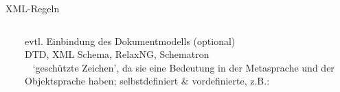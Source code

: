 


\begin{frame}{XML-Regeln}
\begin{columns}
\footnotesize
{}
~ \\

evtl. Einbindung des Dokumentmodells (optional) \\
DTD, XML Schema, RelaxNG, Schematron \\

~ `geschützte Zeichen', da sie eine Bedeutung in der Metasprache und der Objektsprache haben; selbstdefiniert \& vordefinierte, z.B.: \\
\end{columns}


\end{frame}





